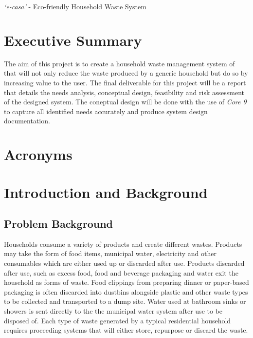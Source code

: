 \documentclass[a4paper,11pt,fleqn]{report}
\begin{document}

\textit{`e-casa'} - Eco-friendly Household Waste System

\chapter*{Executive Summary}
The aim of this project is to create a household waste management system of that will not only reduce the waste produced by a generic household but do so by increasing value to the user. The final deliverable for this project will be a report that details the needs analysis, conceptual design, feasibility and risk assessment of the designed system. The coneptual design will be done with the use of \textit{Core 9} to capture all identified needs accurately and produce system design documentation.

\tableofcontents
\listoffigures{}
\listoftables{}

\chapter*{Acronyms}
\begin{acronym}[ABCDEF]
\end{acronym}

\chapter{Introduction and Background}
\setcounter{page}{1}
\acresetall

\section{Problem Background} \label{sec: Problem Background}
Households consume a variety of products and create different wastes. Products may take the form of food items, municipal water, electricity and other consumables which are either used up or discarded after use. Products discarded after use, such as excess food, food and beverage packaging and water exit the household as forms of waste.  Food clippings from preparing dinner or paper-based packaging is often discarded into dustbins alongside plastic and other waste types to be collected and transported to a dump site. Water used at bathroom sinks or showers is sent directly to the the municipal water system after use to be disposed of. Each type of waste generated by a typical residential household requires proceeding systems that will either store, repurpose or discard the waste.
  
\end{document}
